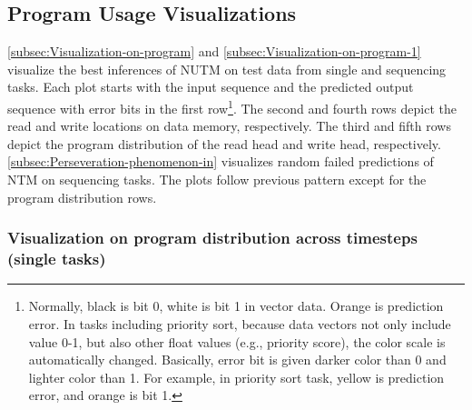 \documentclass[english]{article}
\begin{document}
\subsection{Program Usage Visualizations \label{subsec:Program-Usage-Visualizations}}

\ref{subsec:Visualization-on-program} and \ref{subsec:Visualization-on-program-1}
visualize the best inferences of NUTM on test data from single and
sequencing tasks. Each plot starts with the input sequence and the
predicted output sequence with error bits in the first row\footnote{Normally, black is bit 0, white is bit 1 in vector data. Orange is
prediction error. In tasks including priority sort, because data vectors
not only include value 0-1, but also other float values (e.g., priority
score), the color scale is automatically changed. Basically, error
bit is given darker color than 0 and lighter color than 1. For example,
in priority sort task, yellow is prediction error, and orange is bit
1.}. The second and fourth rows depict the read and write locations on
data memory, respectively. The third and fifth rows depict the program
distribution of the read head and write head, respectively. \ref{subsec:Perseveration-phenomenon-in}
visualizes random failed predictions of NTM on sequencing tasks. The
plots follow previous pattern except for the program distribution
rows. 

\subsubsection{Visualization on program distribution across timesteps (single tasks)\label{subsec:Visualization-on-program}}
\end{document}
